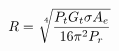 \documentclass[preview]{standalone}
\begin{document}
\begin{align*}
R = \sqrt[\leftroot{-3}\uproot{3}4]{\frac{P_t G_t \sigma A_e}{16 \pi^2 P_r}}
\end{align*}
\end{document}
